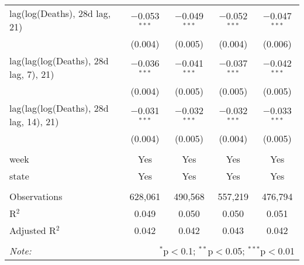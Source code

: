 \begin{tabular}{@{\extracolsep{1pt}}lcccc}
  lag(log(Deaths), 28d lag, 21) & $-$0.053$^{***}$ & $-$0.049$^{***}$ & $-$0.052$^{***}$ & $-$0.047$^{***}$ \\ 
  & (0.004) & (0.005) & (0.004) & (0.006) \\ 
  lag(lag(log(Deaths), 28d lag, 7), 21) & $-$0.036$^{***}$ & $-$0.041$^{***}$ & $-$0.037$^{***}$ & $-$0.042$^{***}$ \\ 
  & (0.004) & (0.005) & (0.005) & (0.005) \\ 
  lag(lag(log(Deaths), 28d lag, 14), 21) & $-$0.031$^{***}$ & $-$0.032$^{***}$ & $-$0.032$^{***}$ & $-$0.033$^{***}$ \\ 
  & (0.004) & (0.005) & (0.004) & (0.005) \\ 
 \hline \\[-1.8ex] 
week & Yes & Yes & Yes & Yes \\ 
state & Yes & Yes & Yes & Yes \\ 
\hline \\[-1.8ex] 
Observations & 628,061 & 490,568 & 557,219 & 476,794 \\ 
R$^{2}$ & 0.049 & 0.050 & 0.050 & 0.051 \\ 
Adjusted R$^{2}$ & 0.042 & 0.042 & 0.043 & 0.042 \\ 
\hline 
\hline \\[-1.8ex] 
\textit{Note:}  & \multicolumn{4}{r}{$^{*}$p$<$0.1; $^{**}$p$<$0.05; $^{***}$p$<$0.01} \\ 
\end{tabular} 